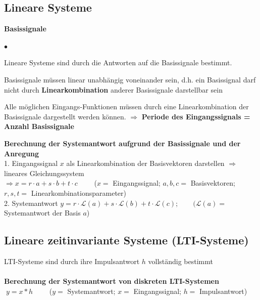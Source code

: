 	\subsection{Lineare Systeme}
		\textbf{Basissignale}
		\begin{list}{$\bullet$}{\setlength{\itemsep}{0cm} \setlength{\parsep}{0cm} \setlength{\topsep}{0cm}} 
          \item Lineare Systeme sind durch die Antworten auf die
          Basissignale bestimmt.
          \item Basissignale müssen linear unabhängig voneinander sein, d.h. ein
		Basissignal darf nicht durch \textbf{Linearkombination} anderer Basissignale
		darstellbar sein          
		  \item Alle möglichen Eingangs-Funktionen müssen durch eine Linearkombination der
		Basissignale dargestellt werden können. $\Rightarrow$ \textbf{Periode des Eingangssignals =	Anzahl Basissignale}
        \end{list}
        \vspace{.2cm}
		\textbf{Berechnung der Systemantwort aufgrund der Basissignale und der
		Anregung}\\
		1. Eingangssignal $x$ als Linearkombination der Basisvektoren darstellen
		$\Rightarrow$ lineares Gleichungssystem\\
		$\Rightarrow x=r\cdot a + s\cdot b + t\cdot c\qquad$ ($x=$
		Eingangssignal; $a,b,c=$ Basisvektoren; $r,s,t=$
		Linearkombinationsparameter)\\ 
		2. Systemantwort $y=r\cdot \mathcal{L}(a) + s\cdot \mathcal{L}(b) + t\cdot \mathcal{L}(c); \qquad (\mathcal{L}(a)=$
		Systemantwort der Basis $a$)
	
	\subsection{Lineare zeitinvariante Systeme (LTI-Systeme)}
		LTI-Systeme sind durch ihre Impulsantwort $h$ vollständig bestimmt\\ \\	
		\textbf{Berechnung der Systemantwort von diskreten LTI-Systemen}\\
		$\; y=x*h \qquad$ ($y=$ Systemantwort; $x=$ Eingangssignal; $h=$
		Impulsantwort)\\
		
